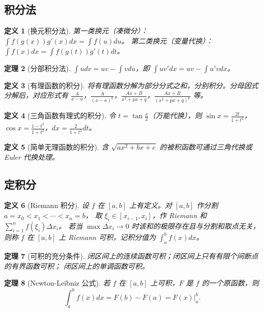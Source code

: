 \documentclass[12pt,a4paper]{ctexart}
\newtheorem{theorem}{定理}[section]
\newtheorem{definition}[theorem]{定义}
\theoremstyle{remark}
\begin{document}
\subsection{积分法}

\begin{definition}[换元积分法]
第一类换元（凑微分）：$\int f(g(x))g'(x)dx = \int f(u) du$。
第二类换元（变量代换）：$\int f(x)dx = \int f(g(t))g'(t)dt$。
\end{definition}

\begin{theorem}[分部积分法]
$\int u dv = uv - \int v du$，即 $\int u v' dx = uv - \int u' v dx$。
\end{theorem}

\begin{definition}[有理函数的积分]
将有理函数分解为部分分式之和，分别积分。分母因式分解后，对应形式有
$\frac{A}{x-a}$，$\frac{A}{(x-a)^k}$，$\frac{Ax+B}{x^2+px+q}$，$\frac{Ax+B}{(x^2+px+q)^k}$ 等。
\end{definition}

\begin{definition}[三角函数有理式的积分]
令 $t = \tan\frac{x}{2}$（万能代换），则 $\sin x = \frac{2t}{1+t^2}$，
$\cos x = \frac{1-t^2}{1+t^2}$，$dx = \frac{2}{1+t^2}dt$。
\end{definition}

\begin{definition}[简单无理函数的积分]
含 $\sqrt{ax^2+bx+c}$ 的被积函数可通过三角代换或 Euler 代换处理。
\end{definition}

\subsection{定积分}

\begin{definition}[Riemann 积分]
设 $f$ 在 $[a,b]$ 上有定义。对 $[a,b]$ 作分割
$a = x_0 < x_1 < \cdots < x_n = b$，
取 $\xi_i \in [x_{i-1}, x_i]$，作 Riemann 和
$\sum_{i=1}^n f(\xi_i)\Delta x_i$。
若当 $\max \Delta x_i \to 0$ 时该和的极限存在且与分割和取点无关，
则称 $f$ 在 $[a,b]$ 上 Riemann 可积，记积分值为
$\int_a^b f(x) dx$。
\end{definition}

\begin{theorem}[可积的充分条件]
闭区间上的连续函数可积；闭区间上只有有限个间断点的有界函数可积；
闭区间上的单调函数可积。
\end{theorem}

\begin{theorem}[Newton-Leibniz 公式]
若 $f$ 在 $[a,b]$ 上可积，$F$ 是 $f$ 的一个原函数，则
\[
\int_a^b f(x) dx = F(b) - F(a) = \left.F(x)\right|_a^b.
\]
\end{theorem}
\end{document}
